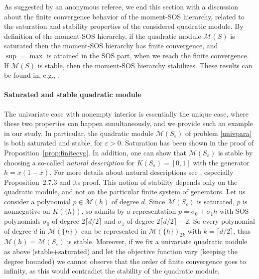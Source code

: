 \documentclass[a4paper,12pt]{article}
\newcommand{\cM}{\mathcal{M}} %
\begin{document}
{
As suggested by an anonymous referee, we end this section with a discussion about the finite convergence behavior of the moment-SOS hierarchy, related to the saturation and stability properties of the considered quadratic module. 
By definition of the moment-SOS hierarchy, if the quadratic module $\cM(S)$ is saturated then the moment-SOS hierarchy has finite convergence, and $\sup=\max$ is attained in the SOS part, when we reach the finite convergence. 
If $\cM(S)$ is stable, then the moment-SOS hierarchy stabilizes. 
These results can be found in, e.g., \cite[Chapter~10]{marshall08}.

\paragraph{{Saturated and stable quadratic module}}
The univariate case with nonempty interior is essentially the unique case, where these two properties can happen simultaneously, and we provide such an example in our study. 
In particular, the quadratic module $\cM(S_{\varepsilon})$ of problem \eqref{univpara}  is both saturated and stable, for $\varepsilon >0$. 
Saturation has been shown in the proof of {Proposition}~\ref{prop:finitecvg}. 
In addition, one can show that $\cM(S_{\varepsilon})$ is stable by choosing a so-called \textit{natural description} for $K(S_{\varepsilon}) = [0, 1]$ with the generator $h=x(1-x)$. 
For more details about natural descriptions see \cite{marshall08}, especially Proposition~2.7.3 and its proof. 
%
This notion of stability depends only on the quadratic module, and not on the particular finite system of generators. 
Let us consider a polynomial $p \in \cM(h)$ of degree $d$. 
Since $\cM(S_{\varepsilon})$ is saturated, $p$ is nonnegative on $K(\{h\})$, so admits by \cite{fekete35} a representation $p = \sigma_0 + \sigma_1 h $ with SOS polynomials $\sigma_0 $ of degree $2 \lceil d / 2 \rceil$ and $\sigma_1$ of degree $2 \lceil d / 2 \rceil - 2$.
So every polynomial of degree $d$ in $\cM(\{h\})$ can be represented in $\cM(\{h\})_{2k}$ with $k=\lceil d / 2 \rceil$, thus $\cM({h})=\cM(S_{\varepsilon})$ is stable.
%
%
Moreover, if we fix a univariate quadratic module as above (stable+saturated) and let the objective function vary (keeping the degree bounded) we cannot observe that the order of finite convergence goes to infinity, as this would contradict the stability of the quadratic module.

}
\end{document}
